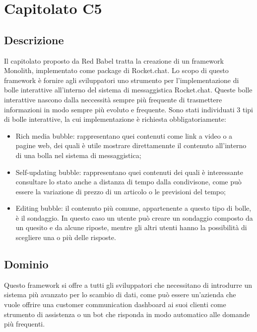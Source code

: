 \newpage
\section{Capitolato C5}

\subsection{Descrizione}

Il capitolato proposto da Red Babel tratta la creazione di un framework
Monolith, implementato come package di Rocket.chat. Lo scopo di questo
framework è fornire agli sviluppatori uno strumento per l'implementazione
di bolle interattive all'interno del sistema di messaggistica Rocket.chat.
Queste bolle interattive nascono dalla neccessità sempre più frequente
di trasmettere informazioni in modo sempre più evoluto e frequente.
Sono stati individuati 3 tipi di bolle interattive, la cui implementazione è richiesta obbligatoriamente:

\begin{itemize}
	\item Rich media bubble: rappresentano quei contenuti come link a video
	o a pagine web, dei quali è utile mostrare direttamennte il contenuto
	all'interno di una bolla nel sistema di messaggistica;
	\item Self-updating bubble: rappresentano quei contenuti dei quali è interessante
	consultare lo stato anche a distanza di tempo dalla condivisone, come
	può essere la variazione di prezzo di un articolo o le previsioni
	del tempo;
	\item Editing bubble: il contenuto più comune, appartenente a questo tipo
	di bolle, è il sondaggio. In questo caso un utente può creare un sondaggio
	composto da un quesito e da alcune riposte, mentre gli altri utenti
	hanno la possibilità di scegliere una o più delle risposte.
\end{itemize}


\subsection{Dominio}

Questo framework si offre a tutti gli sviluppatori che necessitano
di introdurre un sistema più avanzato per lo scambio di dati, come
può essere un'azienda che vuole offrire una customer communication
dashboard ai suoi clienti come strumento di assistenza o un bot che
risponda in modo automatico alle domande più frequenti. 

